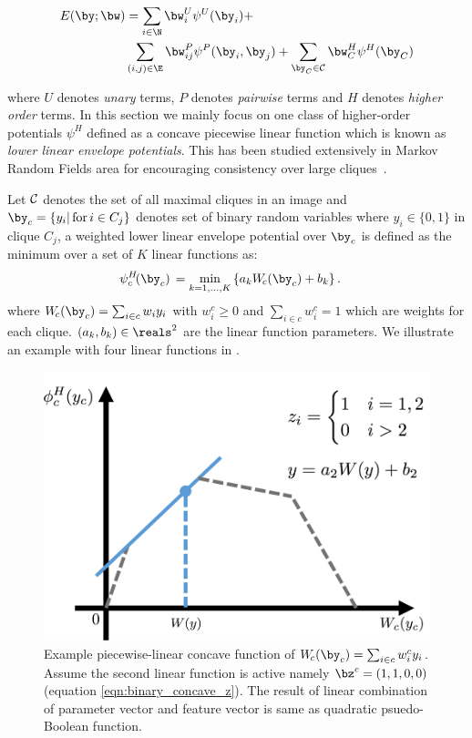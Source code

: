 \documentclass[sigconf]{acmart}
\renewcommand{\cite}{\citep}
\begin{document}
\begin{align}
  \label{eq:energyfunction_UPH}
  E(\by;\bw)&=\sum_{i\in \N}{\bw_i^U\psi^U(\by_i)}+ \notag\\
  & \sum_{(i,j)\in \E}{\bw_{ij}^P\psi^P(\by_i,\by_j)}+
  \sum_{\by_C\in \cal C}{\bw_C^H\psi^H(\by_C)}
\end{align}

\noindent where $U$ denotes \emph{unary} terms, $P$ denotes
\emph{pairwise} terms and $H$ denotes \emph{higher order} terms.
In this section we mainly focus on one class of higher-order
potentials $\psi^H$ defined as a concave piecewise linear
function which is known as \emph{lower linear envelope
  potentials}. This has been studied extensively in Markov Random
Fields area for encouraging consistency over large
cliques~\cite{Kohli:CVPR07,Nowozin:2011,Gould:ICML2011}.

Let $\cal C$ denotes the set of all maximal cliques in an image
and $\by_c=\{y_i |\text{\,for\,} i \in C_j\}$ denotes set of
binary random variables where $y_i\in \{0,1\}$ in clique $C_j$, a
weighted lower linear envelope potential over $\by_c$ is defined
as the minimum over a set of $K$ linear functions as:
%
\begin{align}
  \psi^H_c\!(\by_c) \, &= \min_{k=1, \ldots, K} \left\{ a_k W_{\!c}(\by_c) + b_k \right\}.
  \label{eqn:potential2}
\end{align}
%
where $W_{\!c}(\by_c) = \sum_{i \in c} w_i y_i$ with $w^c_i \geq
0$ and $\sum_{i \in c} w^c_i = 1$ which are weights for each
clique. $(a_k, b_k) \in \reals^2$ are the linear function
parameters. We illustrate an example with
four linear functions in .

\begin{figure}[t]
  \centering
  \includegraphics[width=0.8\columnwidth]{Methodology/figures/linEnvLatentFig.png}
  \caption{\label{fig:concave} Example piecewise-linear concave
    function of $W_{\!c}(\by_c) = \sum_{i \in c} w^c_i y_i$.
    Assume the second linear function is active namely
    $\bz^c=(1,1,0,0)$ (equation \ref{eqn:binary_concave_z}). The result of linear combination of
    parameter vector and feature vector is same as quadratic
    psuedo-Boolean function.}
\end{figure}
\end{document}
